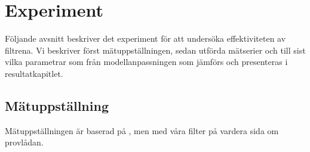 \documentclass[main.tex]{subfiles}
\begin{document}
\chapter{Experiment}
\label{ch:exp}
Följande avsnitt beskriver det experiment för att undersöka effektiviteten av filtrena. Vi beskriver först mätuppställningen, sedan utförda mätserier och till sist vilka parametrar som från modellanpassningen som jämförs och presenteras i resultatkapitlet.



\section{Mätuppställning}
Mätuppställningen är baserad på , men med våra filter på vardera sida om provlådan.

\end{document}
